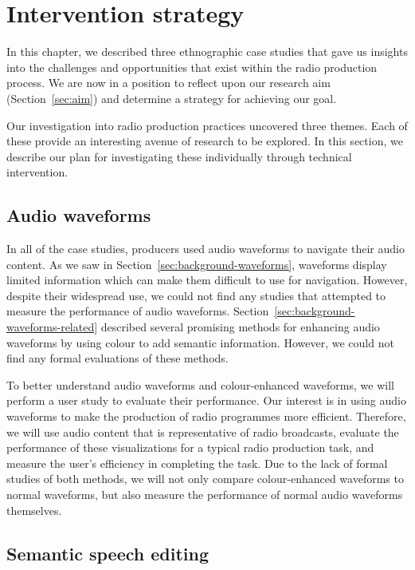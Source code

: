 \clearpage
\section{Intervention strategy}\label{sec:ethno-strategy}

In this chapter, we described three ethnographic case studies that gave us insights into the challenges and
opportunities that exist within the radio production process.  We are now in a position to reflect upon our research
aim (Section~\ref{sec:aim}) and determine a strategy for achieving our goal.

Our investigation into radio production practices uncovered three themes. Each of these provide an interesting avenue
of research to be explored. In this section, we describe our plan for investigating these individually through
technical intervention.

\subsection{Audio waveforms}

In all of the case studies, producers used audio waveforms to navigate their audio content.  As we saw in
Section~\ref{sec:background-waveforms}, waveforms display limited information which can make them difficult to use for
navigation.  However, despite their widespread use, we could not find any studies that attempted to measure the
performance of audio waveforms.  Section~\ref{sec:background-waveforms-related} described several promising methods for
enhancing audio waveforms by using colour to add semantic information. However, we could not find any formal
evaluations of these methods.

To better understand audio waveforms and colour-enhanced waveforms, we will perform a user study to evaluate their
performance. Our interest is in using audio waveforms to make the production of radio programmes more efficient.
Therefore, we will use audio content that is representative of radio broadcasts, evaluate the performance of these
visualizations for a typical radio production task, and measure the user's efficiency in completing the task. Due to
the lack of formal studies of both methods, we will not only compare colour-enhanced waveforms to normal waveforms, but
also measure the performance of normal audio waveforms themselves.

\subsection{Semantic speech editing}

